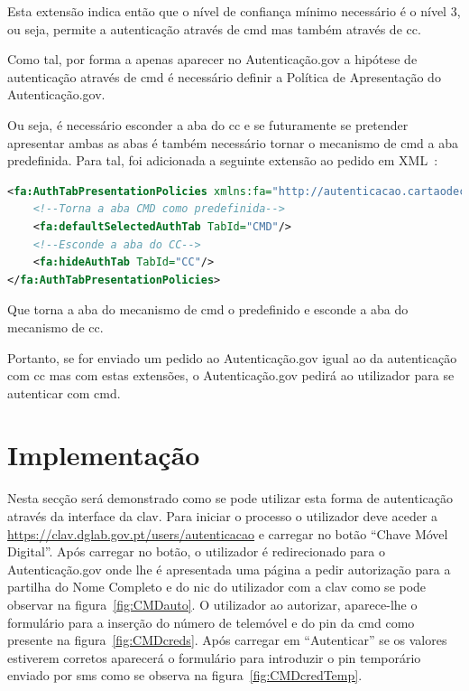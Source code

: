 Esta extensão indica então que o nível de confiança mínimo necessário é o nível 3, ou seja, permite a autenticação 
através de \acrshort{cmd} mas também através de \acrshort{cc}.

Como tal, por forma a apenas aparecer no Autenticação.gov a hipótese de autenticação através de \acrshort{cmd} é 
necessário definir a Política de Apresentação do Autenticação.gov.

Ou seja, é necessário esconder a aba do \acrfull{cc} e se futuramente se pretender apresentar ambas as abas é 
também necessário tornar o mecanismo de \acrfull{cmd} a aba predefinida. Para tal, foi adicionada a seguinte 
extensão ao pedido em XML~\cite{agov2}:
\begin{lstlisting}[language=xml, caption=Extensão Política de Apresentação no pedido enviado ao Autenticação.gov]
<fa:AuthTabPresentationPolicies xmlns:fa="http://autenticacao.cartaodecidadao.pt/presentationpolicy">
    <!--Torna a aba CMD como predefinida-->
    <fa:defaultSelectedAuthTab TabId="CMD"/>
    <!--Esconde a aba do CC-->
    <fa:hideAuthTab TabId="CC"/> 
</fa:AuthTabPresentationPolicies>
\end{lstlisting}

Que torna a aba do mecanismo de \acrshort{cmd} o predefinido e esconde a aba do mecanismo de \acrshort{cc}.

Portanto, se for enviado um pedido ao Autenticação.gov igual ao da autenticação com \acrshort{cc} mas com estas 
extensões, o Autenticação.gov pedirá ao utilizador para se autenticar com \acrshort{cmd}.

\section{Implementação}

Nesta secção será demonstrado como se pode utilizar esta forma de autenticação através da interface da \acrshort{clav}. Para iniciar o processo o utilizador deve aceder a \url{https://clav.dglab.gov.pt/users/autenticacao} e carregar no botão ``Chave Móvel Digital''. Após carregar no botão, o utilizador é redirecionado para o Autenticação.gov onde lhe é apresentada uma página a pedir autorização para a partilha do Nome Completo e do \acrshort{nic} do utilizador com a \acrshort{clav} como se pode observar na figura~\ref{fig:CMDauto}. O utilizador ao autorizar, aparece-lhe o formulário para a inserção do número de telemóvel e do \acrshort{pin} da \acrshort{cmd} como presente na figura~\ref{fig:CMDcreds}. Após carregar em ``Autenticar'' se os valores estiverem corretos aparecerá o formulário para introduzir o \acrshort{pin} temporário enviado por \acrshort{sms} como se observa na figura~\ref{fig:CMDcredTemp}.

